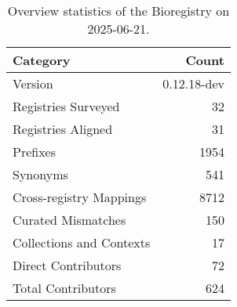\begin{table}
\caption{Overview statistics of the Bioregistry on 2025-06-21.}
\label{tab:bioregistry-summary}
\begin{tabular}{lr}
\toprule
Category & Count \\
\midrule
Version & 0.12.18-dev \\
Registries Surveyed & 32 \\
Registries Aligned & 31 \\
Prefixes & 1954 \\
Synonyms & 541 \\
Cross-registry Mappings & 8712 \\
Curated Mismatches & 150 \\
Collections and Contexts & 17 \\
Direct Contributors & 72 \\
Total Contributors & 624 \\
\bottomrule
\end{tabular}
\end{table}
